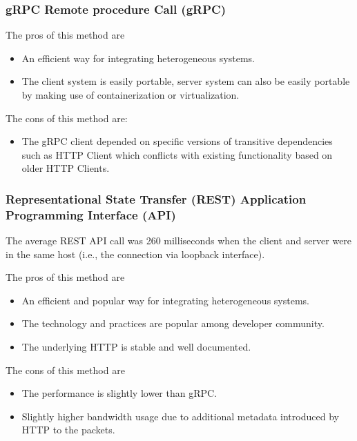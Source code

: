\subsubsection{gRPC Remote procedure Call (gRPC)} \label{sec:eval-rpc}

The pros of this method are
\begin{itemize}
	\item An efficient way for integrating heterogeneous systems.
	\item The client system is easily portable, server system can also be easily portable by making use of containerization or virtualization.
\end{itemize}

The cons of this method are:
\begin{itemize}
	\item The gRPC client depended on specific versions of transitive dependencies such as HTTP Client which conflicts with existing functionality based on older HTTP Clients.
\end{itemize}

\subsubsection{Representational State Transfer (REST) Application Programming Interface (API)} \label{sec:eval-rest}

The average REST API call was 260 milliseconds when the client and server were in the same host (i.e., the connection via loopback interface).

The pros of this method are
\begin{itemize}
	\item An efficient and popular way for integrating heterogeneous systems.
	\item The technology and practices are popular among developer community.
	\item The underlying HTTP is stable and well documented.
\end{itemize}

The cons of this method are
\begin{itemize}
	\item The performance is slightly lower than gRPC.
	\item Slightly higher bandwidth usage due to additional metadata introduced by HTTP to the packets.
\end{itemize}
\fi  %
